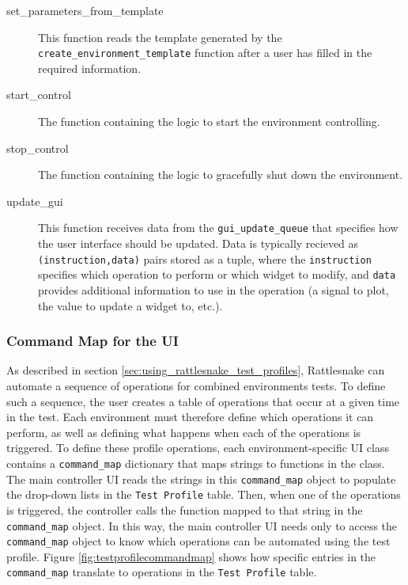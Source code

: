 \documentclass[pdf,12pt,report]{SANDreport}
\newcommand{\inlineCode}{\lstinline[basicstyle=\bfseries\ttfamily]}
\begin{document}
\begin{description}
    \item[set\_parameters\_from\_template] This function reads the template generated by the \inlineCode{create_environment_template} function after a user has filled in the required information.
    
    \item[start\_control] The function containing the logic to start the environment controlling.
    
    \item[stop\_control] The function containing the logic to gracefully shut down the environment.
    
    \item[update\_gui] This function receives data from the \inlineCode{gui_update_queue} that specifies how the user interface should be updated.  Data is typically recieved as \inlineCode{(instruction,data)} pairs stored as a tuple, where the \inlineCode{instruction} specifies which operation to perform or which widget to modify, and \inlineCode{data} provides additional information to use in the operation (a signal to plot, the value to update a widget to, etc.).
    \end{description}
    
    \subsubsection{Command Map for the \Ac{UI}}
    
    As described in section \ref{sec:using_rattlesnake_test_profiles}, Rattlesnake can automate a sequence of operations for combined environments tests.  To define such a sequence, the user creates a table of operations that occur at a given time in the test.  Each environment must therefore define which operations it can perform, as well as defining what happens when each of the operations is triggered.  To define these profile operations, each environment-specific \ac{UI} class contains a \inlineCode{command_map} dictionary that maps strings to functions in the class.  The main controller \ac{UI} reads the strings in this \inlineCode{command_map} object to populate the drop-down lists in the \inlineCode{Test Profile} table.  Then, when one of the operations is triggered, the controller calls the function mapped to that string in the \inlineCode{command_map} object.  In this way, the main controller \ac{UI} needs only to access the \inlineCode{command_map} object to know which operations can be automated using the test profile.  Figure \ref{fig:testprofilecommandmap} shows how specific entries in the \inlineCode{command_map} translate to operations in the \inlineCode{Test Profile} table.
    
\end{document}
